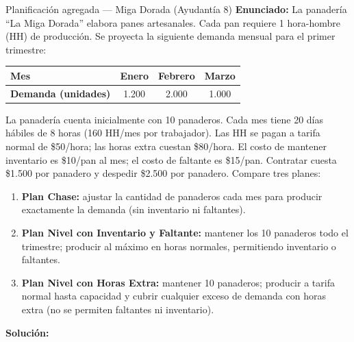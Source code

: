 \begin{ejercicio}{Planificación agregada --- Miga Dorada (Ayudantía 8)}
\textbf{Enunciado:}
La panadería ``La Miga Dorada'' elabora panes artesanales. Cada pan requiere 1 hora-hombre (HH) de producción. Se proyecta la siguiente demanda mensual para el primer trimestre:
\begin{center}
\begin{tabular}{@{}lccc@{}}
  \toprule
  \textbf{Mes} & Enero & Febrero & Marzo \\
  \midrule
  \textbf{Demanda (unidades)} & 1.200 & 2.000 & 1.000 \\
  \bottomrule
\end{tabular}
\end{center}
La panadería cuenta inicialmente con 10 panaderos. Cada mes tiene 20 días hábiles de 8 horas (160 HH/mes por trabajador). Las HH se pagan a tarifa normal de \$50/hora; las horas extra cuestan \$80/hora. El costo de mantener inventario es \$10/pan al mes; el costo de faltante es \$15/pan. Contratar cuesta \$1.500 por panadero y despedir \$2.500 por panadero. Compare tres planes:
\begin{enumerate}
  \item \textbf{Plan Chase:} ajustar la cantidad de panaderos cada mes para producir exactamente la demanda (sin inventario ni faltantes).
  \item \textbf{Plan Nivel con Inventario y Faltante:} mantener los 10 panaderos todo el trimestre; producir al máximo en horas normales, permitiendo inventario o faltantes.
  \item \textbf{Plan Nivel con Horas Extra:} mantener 10 panaderos; producir a tarifa normal hasta capacidad y cubrir cualquier exceso de demanda con horas extra (no se permiten faltantes ni inventario).
\end{enumerate}

\textbf{Solución:}


\end{ejercicio}
